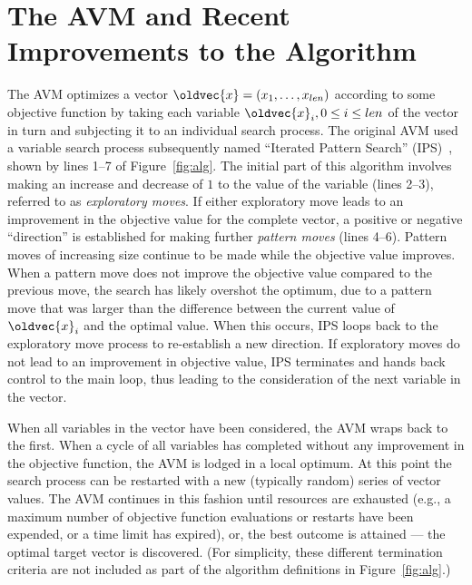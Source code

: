 \documentclass{llncs}
\let\vec\oldvec %
\newcommand{\inlineheading}[1]{\vspace{1mm} \noindent {\bf #1.}}
\begin{document}
\section{The AVM and Recent Improvements to the Algorithm}
\vspace{-1em}
\inlineheading{The Original AVM} The AVM optimizes a vector $\vec{x} = (x_1, \dots, x_{len})$ according to some objective function by taking each variable $\vec{x}_i, 0 \leq i \leq len$ of the vector in turn and subjecting it to an individual search process. The original AVM used a variable search process subsequently named
``Iterated Pattern Search'' (IPS)~\cite{Kempka2013,Kempka2015}, shown by lines 1--7 of Figure~\ref{fig:alg}. The initial part of
this algorithm involves making an increase and decrease of $1$ to the value of the variable (lines 2--3), referred to as
{\it exploratory moves}. If either exploratory move leads to an improvement in the objective value for the complete
vector, a positive or negative ``direction'' is established for making further {\it pattern moves} (lines 4--6). Pattern
moves of increasing size continue to be made while the objective value improves. When a pattern move does not improve
the objective value compared to the previous move, the search has likely overshot the optimum, due to a pattern move
that was larger than the difference between the current value of $\vec{x}_i$ and the optimal value. When this occurs,
IPS loops back to the exploratory move process to re-establish a new direction. If exploratory moves do not lead to an
improvement in objective value, IPS terminates and hands back control to the main loop, thus leading to the consideration of the next variable in the vector.

When all variables in the vector have been considered, the AVM wraps back to the first. When a cycle of all variables has completed without any improvement in the objective function, the AVM is lodged in a local optimum. At this point the search process can be restarted with a new (typically random) series of vector values. The AVM continues in this fashion until resources are exhausted (e.g., a maximum number of objective function evaluations or restarts have been expended, or a time limit has expired), or, the best outcome is attained --- the optimal target vector is discovered. (For simplicity, these different termination criteria are not included as part of the algorithm definitions in Figure~\ref{fig:alg}.)
\end{document}

